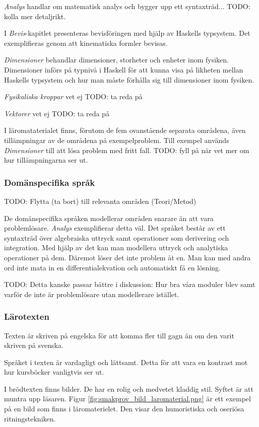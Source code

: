 \begin{binge}
\textit{Analys} handlar om matematisk analys och bygger upp ett syntaxträd...
TODO: kolla mer detaljrikt.

I \textit{Bevis}-kapitlet presenteras bevisföringen med hjälp av Haskells
typsystem. Det exemplifieras genom att kinematiska formler bevisas.

\textit{Dimensioner} behandlar dimensioner, storheter och enheter inom fysiken.
Dimensioner införs på typnivå i Haskell för att kunna visa på likheten mellan
Haskells typsystem och hur man måste förhålla sig till dimensioner inom
fysiken.

\textit{Fysikaliska kroppar} vet ej TODO: ta reda på

\textit{Vektorer} vet ej TODO: ta reda på

I läromataterialet finns, förutom de fem ovanstående separata områdena, även tillämpningar av de områdena på exempelproblem. Till exempel används \textit{Dimensioner} till att lösa problem med fritt fall. TODO: fyll på när vet mer om hur tillämpningarna ser ut.

\subsubsection{Domänspecifika språk}
TODO: Flytta (ta bort) till relevanta områden (Teori/Metod)

De domänspecifika språken modellerar områden snarare än att vara problemlösare.
\textit{Analys} exemplifierar detta väl. Det språket består av ett syntaxträd
över algebraiska uttryck samt operationer som derivering och integration. Med
hjälp av det kan man modellera uttryck och analytiska operationer på dem.
Däremot löser det inte problem åt en. Man kan med andra ord inte mata in en
differentialekvation och automatiskt få en lösning.

TODO: Detta kanske passar bättre i diskussion: Hur bra våra moduler blev samt varför de inte är problemlösare utan modellerare istället.

\subsubsection{Lärotexten}

Texten är skriven på engelska för att komma fler till gagn än om den varit
skriven på svenska.

Språket i texten är vardagligt och lättsamt. Detta för att vara en kontrast mot
hur kursböcker vanligtvis ser ut.

I brödtexten finns bilder. De har en rolig och medvetet kladdig stil. Syftet är
att muntra upp läsaren. Figur \ref{fig:smakprov_bild_laromaterial.png} är ett
exempel på en bild som finns i läromaterielet. Den visar den humoristiska och
oseriösa ritningstekniken.


\end{binge}
